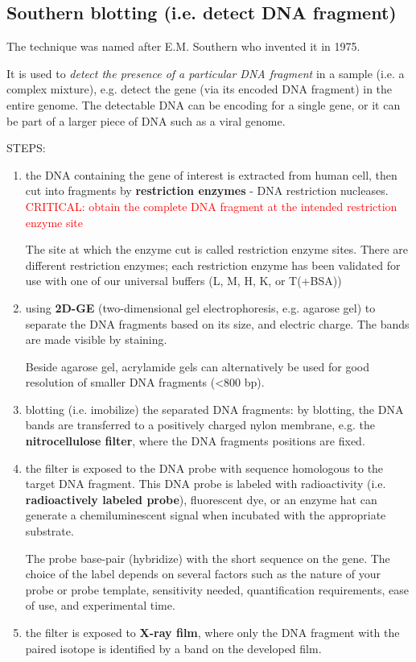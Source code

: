 \subsection{Southern blotting (i.e. detect DNA fragment)}
\label{sec:Southern-blotting}

The technique was named after E.M. Southern who invented it in 1975.

It is used to {\it detect the presence of a particular DNA fragment} in a sample
(i.e. a complex mixture), e.g. detect the gene (via its encoded DNA fragment) in
the entire genome. The detectable DNA can be encoding for a single gene, or it
can be part of a larger piece of DNA such as a viral genome.

STEPS:
\begin{enumerate}
  \item the DNA containing the gene of interest is extracted from human cell,
  then cut into fragments by {\bf restriction enzymes} - DNA restriction nucleases.
  \textcolor{red}{CRITICAL: obtain the complete DNA fragment at the intended
  restriction enzyme site}
  
  The site at which the enzyme cut is called restriction enzyme sites.
  There are different restriction enzymes; each restriction enzyme has been
  validated for use with one of our universal buffers (L, M, H, K, or T(+BSA))
  
  \item using {\bf 2D-GE} (two-dimensional gel electrophoresis, e.g. agarose
  gel) to separate the DNA fragments based on its size, and electric charge. The
  bands are made visible by staining.
  
  Beside agarose gel, acrylamide gels can alternatively be used for good
  resolution of smaller DNA fragments (<800 bp). 
 
  
  \item blotting (i.e. imobilize) the separated DNA fragments:
  by blotting, the DNA bands are transferred to a positively charged nylon
  membrane, e.g. the {\bf nitrocellulose filter}, where the DNA fragments
  positions are fixed.
  
  \item the filter is exposed to the DNA probe with sequence homologous to the
  target DNA fragment. This DNA probe is labeled with radioactivity (i.e. {\bf
  radioactively labeled probe}), fluorescent dye, or an enzyme
  hat can generate a chemiluminescent signal when incubated with the appropriate
   substrate. 
  
  The probe   base-pair (hybridize) with the short sequence on the gene.
  The choice of the label depends on several factors such as the nature of your
  probe or probe template, sensitivity needed, quantification requirements, ease
  of use, and experimental time.
  
  \item the filter is exposed to {\bf X-ray film}, where only the DNA fragment
  with the paired isotope is identified by a band on the developed film.

\end{enumerate}

